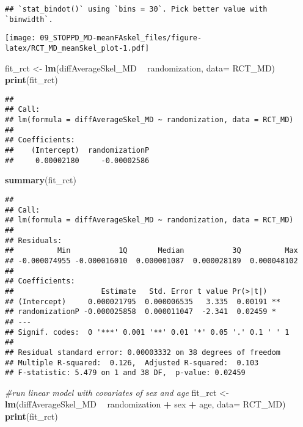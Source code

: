 \documentclass[]{article}
\newenvironment{Shaded}{\begin{snugshade}}{\end{snugshade}}
\newcommand{\KeywordTok}[1]{\textcolor[rgb]{0.13,0.29,0.53}{\textbf{#1}}}
\newcommand{\DataTypeTok}[1]{\textcolor[rgb]{0.13,0.29,0.53}{#1}}
\newcommand{\StringTok}[1]{\textcolor[rgb]{0.31,0.60,0.02}{#1}}
\newcommand{\CommentTok}[1]{\textcolor[rgb]{0.56,0.35,0.01}{\textit{#1}}}
\newcommand{\OperatorTok}[1]{\textcolor[rgb]{0.81,0.36,0.00}{\textbf{#1}}}
\newcommand{\NormalTok}[1]{#1}
\theoremstyle{definition}
\theoremstyle{definition}
\theoremstyle{definition}
\theoremstyle{remark}
\begin{document}
\begin{verbatim}
## `stat_bindot()` using `bins = 30`. Pick better value with `binwidth`.
\end{verbatim}

\texttt{[image: 09\_STOPPD\_MD-meanFAskel\_files/figure-latex/RCT\_MD\_meanSkel\_plot-1.pdf]}

\begin{Shaded}
\begin{Highlighting}[]
\NormalTok{fit_rct <-}\StringTok{ }\KeywordTok{lm}\NormalTok{(diffAverageSkel_MD }\OperatorTok{~}\StringTok{ }\NormalTok{randomization, }\DataTypeTok{data=}\NormalTok{ RCT_MD)}
\KeywordTok{print}\NormalTok{(fit_rct)}
\end{Highlighting}
\end{Shaded}

\begin{verbatim}
## 
## Call:
## lm(formula = diffAverageSkel_MD ~ randomization, data = RCT_MD)
## 
## Coefficients:
##    (Intercept)  randomizationP  
##     0.00002180     -0.00002586
\end{verbatim}

\begin{Shaded}
\begin{Highlighting}[]
\KeywordTok{summary}\NormalTok{(fit_rct)}
\end{Highlighting}
\end{Shaded}

\begin{verbatim}
## 
## Call:
## lm(formula = diffAverageSkel_MD ~ randomization, data = RCT_MD)
## 
## Residuals:
##          Min           1Q       Median           3Q          Max 
## -0.000074955 -0.000016010  0.000001087  0.000028189  0.000048102 
## 
## Coefficients:
##                    Estimate   Std. Error t value Pr(>|t|)   
## (Intercept)     0.000021795  0.000006535   3.335  0.00191 **
## randomizationP -0.000025858  0.000011047  -2.341  0.02459 * 
## ---
## Signif. codes:  0 '***' 0.001 '**' 0.01 '*' 0.05 '.' 0.1 ' ' 1
## 
## Residual standard error: 0.00003332 on 38 degrees of freedom
## Multiple R-squared:  0.126,  Adjusted R-squared:  0.103 
## F-statistic: 5.479 on 1 and 38 DF,  p-value: 0.02459
\end{verbatim}

\begin{Shaded}
\begin{Highlighting}[]
\CommentTok{#run linear model with covariates of sex and age}
\NormalTok{fit_rct <-}\StringTok{ }\KeywordTok{lm}\NormalTok{(diffAverageSkel_MD }\OperatorTok{~}\StringTok{ }\NormalTok{randomization }\OperatorTok{+}\StringTok{ }\NormalTok{sex }\OperatorTok{+}\StringTok{ }\NormalTok{age, }\DataTypeTok{data=}\NormalTok{ RCT_MD)}
\KeywordTok{print}\NormalTok{(fit_rct)}
\end{Highlighting}
\end{Shaded}
\end{document}
